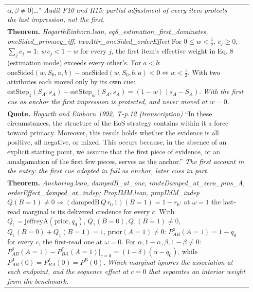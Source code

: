 \documentclass[10pt]{article}
\theoremstyle{definition}
\newcommand{\PB}{P^{\mathrm{B}}}
\newcommand{\PJ}{P^{\mathrm{J}}}
\newlength{\fullw}\setlength{\fullw}{25.9cm}
\begin{document}
{\begin{longtable}{|p{0.9cm}|p{12.2cm}|p{12.2cm}|}
{$\alpha, \beta \ne 0$)\ldots'' \newline \textit{Audit P10 and H15: partial adjustment of every item protects the last impression, not the first.}} \\
\multicolumn{3}{|p{\fullw}|}{\textbf{Theorem.} \textit{HogarthEinhorn.lean, eq8\_estimation\_first\_dominates, oneSided\_primacy\_iff, twoAttr\_oneSided\_orderEffect} \newline For $0\le w<\tfrac12$, $c_j\ge0$, $\sum_j c_j=1$: $w\,c_j<1-w$ for every $j$,
the first item's effective weight in Eq. 8 (estimation mode) exceeds every other's.
For $a<b$: $\mathrm{oneSided}(w,S_0,a,b)-\mathrm{oneSided}(w,S_0,b,a)<0\iff w<\tfrac12$.
With two attributes each moved only by its own cue:
$\mathrm{estStep}_1(S_A,s_A)-\mathrm{estStep}_w(S_A,s_A)=(1-w)(s_A-S_A)$. \newline \textit{With the first cue as anchor the first impression is protected, and never moved at $w=0$.}} \\
\multicolumn{3}{|p{\fullw}|}{\textbf{Quote.} \textit{Hogarth and Einhorn 1992, T-p.12 (transcription)} \newline ``In these circumstances, the structure of the EoS strategy contains within it a
force toward primacy. Moreover, this result holds whether the evidence is all
positive, all negative, or mixed. This occurs because, in the absence of an explicit
starting point, we assume that the first piece of evidence, or an amalgamation of the
first few pieces, serves as the anchor.'' \newline \textit{The first account in the entry: the first cue adopted in full as anchor, later cues in part.}} \\
\multicolumn{3}{|p{\fullw}|}{\textbf{Theorem.} \textit{Anchoring.lean, dampedB\_at\_one, routeDamped\_at\_zero\_pins\_A, orderEffect\_damped\_at\_indep; PropIMM.lean, propIMM\_indep} \newline $Q(B{=}1)\neq0\Rightarrow(\mathrm{dampedB}\,Q\,r_0\,1)(B{=}1)=1-r_0$: at $\omega=1$ the
last-read marginal is its delivered credence for every $c$. With
$Q_1=\mathrm{jeffreyA}(\mathrm{prior},q_0)$, $Q_1(B{=}0),Q_1(B{=}1)\neq0$,
$Q_1(B{=}0)+Q_1(B{=}1)=1$, $\mathrm{prior}(A{=}1)\neq0$: $P^{0}_{AB}(A{=}1)=1-q_0$ for
every $c$, the first-read one at $\omega=0$. For $\alpha,1-\alpha,\beta,1-\beta\neq0$:
$P^{\delta}_{AB}(A{=}1)-P^{\delta}_{BA}(A{=}1)\big|_{c=0}=(1-\delta)(\alpha-q_0)$, while
$\PJ_{AB}(0)=\PJ_{BA}(0)=\PB(0)$. \newline \textit{Which marginal ignores the association at each endpoint, and the sequence effect at $c=0$ that separates an interior weight from the benchmark.}} \\

\end{longtable}}
\end{document}
